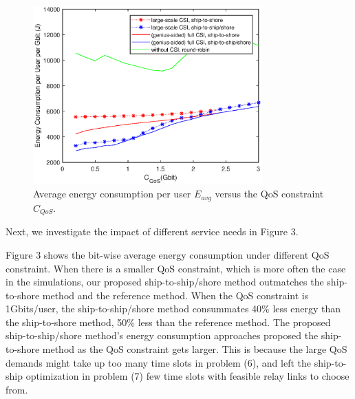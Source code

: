 \documentclass[conference]{IEEEtran}
\begin{document}
\begin{figure} [htb]
\begin{center}
\includegraphics*[width=8.8cm]{Cqos.eps}
\end{center}
\vspace*{-4mm} 
\caption{Average energy consumption per user $E_{avg}$ versus the QoS constraint ${C_{QoS}}$.}\label{fig:3}
\vspace*{-2mm} 
\end{figure}



Next, we investigate the impact of different service needs in Figure 3. 

Figure 3 shows the bit-wise average energy consumption under different QoS constraint.
When there is a smaller QoS constraint, which is more often the case in the simulations, our proposed ship-to-ship/shore method outmatches the ship-to-shore method and the reference method. When the QoS constraint is 1Gbits/user, the ship-to-ship/shore method consummates 40\% less energy than the ship-to-shore method, 50\% less than the reference method. The proposed ship-to-ship/shore method's energy consumption approaches proposed the ship-to-shore method as the QoS constraint gets larger. This is because the large QoS demands might take up too many time slots in problem (6), and left the ship-to-ship optimization in problem (7) few time slots with feasible relay links to choose from.
\end{document}
